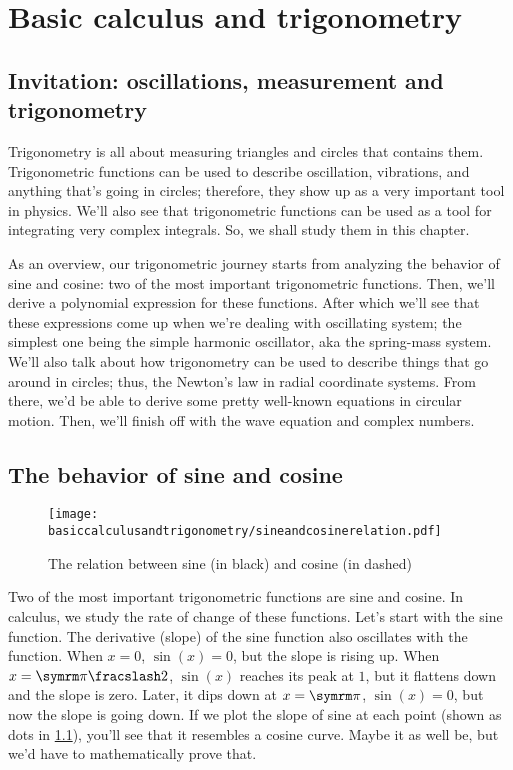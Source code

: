 \chapter{Basic calculus and trigonometry}


\section{Invitation: oscillations, measurement and trigonometry}

Trigonometry is all about measuring triangles and circles that contains them. Trigonometric functions can be used to describe oscillation, vibrations, and anything that's going in circles; therefore, they show up as a very important tool in physics. We'll also see that trigonometric functions can be used as a tool for integrating very complex integrals. So, we shall study them in this chapter.

As an overview, our trigonometric journey starts from analyzing the behavior of sine and cosine: two of the most important trigonometric functions. Then, we'll derive a polynomial expression for these functions. After which we'll see that these expressions come up when we're dealing with oscillating system; the simplest one being the simple harmonic oscillator, aka the spring-mass system. We'll also talk about how trigonometry can be used to describe things that go around in circles; thus, the Newton's law in radial coordinate systems. From there, we'd be able to derive some pretty well-known equations in circular motion. Then, we'll finish off with the wave equation and complex numbers.

\section{The behavior of sine and cosine}

\begin{figure}[ht]
    \centering
    \texttt{[image: basiccalculusandtrigonometry/sineandcosinerelation.pdf]}
    \caption{The relation between sine (in black) and cosine (in dashed)}
    \label{fig:sine_cosine_relation}
\end{figure}

Two of the most important trigonometric functions are sine and cosine. In calculus, we study the rate of change of these functions. Let's start with the sine function. The derivative (slope) of the sine function also oscillates with the function. When $x = 0$, $\sin(x) = 0$, but the slope is rising up. When $x = \flatfrac{\cpi}{2}$, $\sin(x)$ reaches its peak at $1$, but it flattens down and the slope is zero. Later, it dips down at $x = \cpi$, $\sin(x) = 0$, but now the slope is going down. If we plot the slope of sine at each point (shown as dots in \cref{fig:sine_cosine_relation}), you'll see that it resembles a cosine curve. Maybe it as well be, but we'd have to mathematically prove that.


